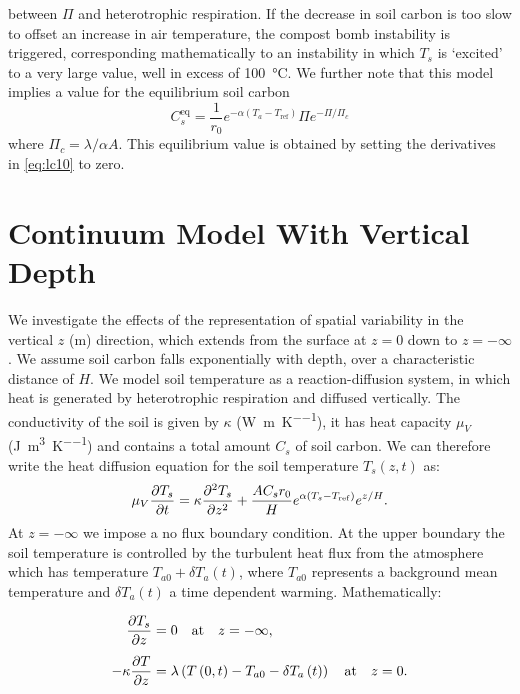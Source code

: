 between $\Pi$ and heterotrophic respiration.  
If the decrease in soil carbon is too slow to offset an increase in air temperature, the compost bomb instability is triggered, corresponding mathematically to an instability in which
$T_s$ is `excited' to a very large value, well in excess of \SI{100}{\degreeCelsius}. We further note that this model implies a value for the equilibrium soil carbon
\begin{equation}
  \label{eq:equilibrium_soil_carbon}
  C_s^{\mathrm{eq}} = \frac{1}{r_0}e^{-\alpha \left( T_a - T_{\mathrm{ref}}\right)} \Pi e^{-\Pi/\Pi_c}
\end{equation}
where $\Pi_c = \lambda /\alpha A$. This equilibrium value is obtained by setting the derivatives in \cref{eq:lc10} to zero.

\section{Continuum Model With Vertical Depth}
\label{sec:continuum_model}
We investigate the effects of the representation of spatial variability in the vertical $z$ (\si{\meter}) direction, which extends from the
surface at $z = 0$ down to $z = -\infty$. We assume soil carbon falls exponentially with depth, over a characteristic distance of $H$.
We model soil temperature as a reaction-diffusion system, in which heat is generated
by heterotrophic respiration and diffused vertically. The conductivity of the soil is given by $\kappa$ (\si{\watt\per\meter\per\kelvin})\cite{Best2005},
it has heat capacity $\mu_V$ (\si{\joule\per\cubic\meter\per\kelvin}) and contains a total amount $C_s$ of soil carbon. We can therefore write the heat diffusion
equation for the soil temperature $T_s(z,t)$ as:
\begin{equation}
  \label{eq:one_d_model}
  \mu_V \pdv{T_s}{t} = \kappa \pdv[2]{T_s}{z} + \frac{AC_sr_0}{H}e^{\alpha (T_s - T_{\mathrm{ref}})}e^{z/H}.
\end{equation}
At $z=-\infty$ we impose a no flux boundary condition.
At the upper boundary the soil temperature is controlled by the turbulent heat flux from the atmosphere which has temperature
$T_{a0} + \delta T_a(t)$, where $T_{a0}$ represents a background mean temperature and $\delta T_a(t)$ a time dependent warming. Mathematically:

\begin{subequations}
  \label{eq:dimensional_bcs_nonuniform}
  \begin{align}
  \pdv{T_s}{z} &= 0 \quad \mathrm{at} \quad z = -\infty,\label{subeq:dimensional_bcs_nonuniform_lower} \\[1ex] 
  - \kappa\pdv{T}{z} &=   \lambda\left(T\left(0,t\right) - T_{a0} - \delta T_a\left(t\right)\right) \quad \mathrm{at}\quad z = 0.\label{subeq:dimensional_bcs_nonuniform_upper}
  \end{align}
\end{subequations}

